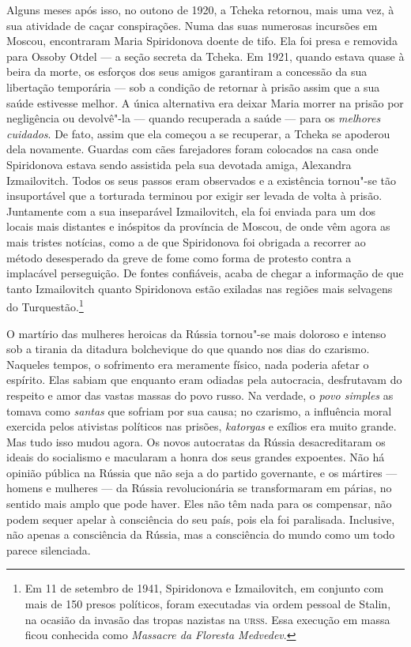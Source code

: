 Alguns meses após isso, no outono de 1920, a Tcheka retornou, mais uma vez,
à sua atividade de caçar conspirações. Numa das suas numerosas incursões
em Moscou, encontraram Maria Spiridonova doente de tifo. Ela foi presa
e removida para Ossoby Otdel --- a seção secreta da Tcheka. Em 1921,
quando estava quase à beira da morte, os esforços dos seus amigos
garantiram a concessão da sua libertação temporária --- sob a condição de
retornar à prisão assim que a sua saúde estivesse melhor. A única
alternativa era deixar Maria morrer na prisão por negligência ou
devolvê"-la --- quando recuperada a saúde --- para os \textit{melhores cuidados}.
De fato, assim que ela começou a se recuperar, a Tcheka se apoderou dela
novamente. Guardas com cães farejadores foram colocados na casa onde
Spiridonova estava sendo assistida pela sua devotada amiga, Alexandra
Izmailovitch. Todos os seus passos eram observados e a existência
tornou"-se tão insuportável que a torturada terminou por exigir ser
levada de volta à prisão. Juntamente com a sua inseparável Izmailovitch,
ela foi enviada para um dos locais mais distantes e inóspitos da
província de Moscou, de onde vêm agora as mais tristes notícias, como a
de que Spiridonova foi obrigada a recorrer ao método desesperado da
greve de fome como forma de protesto contra a implacável perseguição. De fontes
confiáveis, ​​acaba de chegar a informação de que tanto Izmailovitch
quanto Spiridonova estão exiladas nas regiões mais selvagens do
Turquestão.\footnote{Em 11 de setembro de 1941, Spiridonova e
  Izmailovitch, em conjunto com mais de 150 presos políticos, foram
  executadas via ordem pessoal de Stalin, na ocasião da invasão das
  tropas nazistas na \textsc{urss}. Essa execução em massa ficou conhecida como
  \textit{Massacre da Floresta Medvedev}.}

O martírio das mulheres heroicas da Rússia tornou"-se mais doloroso e
intenso sob a tirania da ditadura bolchevique do que quando nos dias do
czarismo. Naqueles tempos, o sofrimento era meramente físico, nada
poderia afetar o espírito. Elas sabiam que enquanto eram odiadas pela
autocracia, desfrutavam do respeito e amor das vastas massas do povo
russo. Na verdade, o \textit{povo simples} as tomava como \textit{santas} que
sofriam por sua causa; no czarismo, a influência moral exercida pelos
ativistas políticos nas prisões, \textit{katorgas} e exílios era muito grande.
Mas tudo isso mudou agora. Os novos autocratas da Rússia desacreditaram
os ideais do socialismo e macularam a honra dos seus grandes expoentes.
Não há opinião pública na Rússia que não seja a do partido governante, e\label{ref2}
os mártires --- homens e mulheres --- da Rússia revolucionária se
transformaram em párias, no sentido mais amplo que pode haver. Eles não
têm nada para os compensar, não podem sequer apelar à consciência do seu
país, pois ela foi paralisada. Inclusive, não apenas a consciência da
Rússia, mas a consciência do mundo como um todo parece silenciada.

